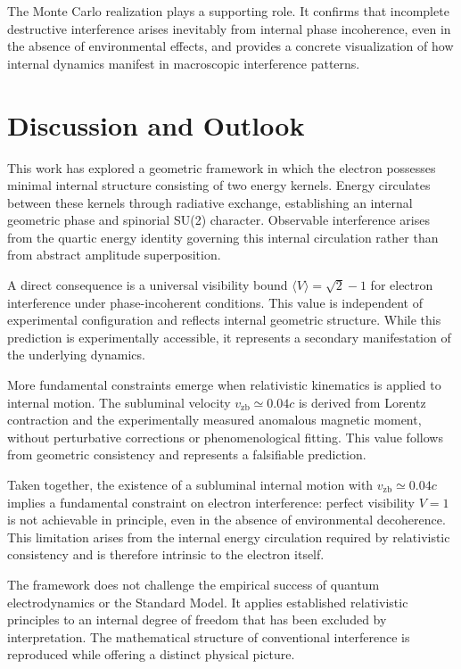\documentclass[%
 reprint,
 amsmath,amssymb,
 aps,
 prb,
]{revtex4-2}
\numberwithin{equation}{section}
\begin{document}
The Monte Carlo realization plays a supporting role. It confirms that incomplete destructive interference arises inevitably from internal phase incoherence, even in the absence of environmental effects, and provides a concrete visualization of how internal dynamics manifest in macroscopic interference patterns.


\section{Discussion and Outlook}
\label{sec:discussion}

This work has explored a geometric framework in which the electron possesses minimal internal structure consisting of two energy kernels. Energy circulates between these kernels through radiative exchange, establishing an internal geometric phase and spinorial SU(2) character. Observable interference arises from the quartic energy identity governing this internal circulation rather than from abstract amplitude superposition.

A direct consequence is a universal visibility bound $\langle V \rangle = \sqrt{2} - 1$ for electron interference under phase-incoherent conditions. This value is independent of experimental configuration and reflects internal geometric structure. While this prediction is experimentally accessible, it represents a secondary manifestation of the underlying dynamics.

More fundamental constraints emerge when relativistic kinematics is applied to internal motion. The subluminal velocity $v_{\mathrm{zb}} \simeq 0.04c$ is derived from Lorentz contraction and the experimentally measured anomalous magnetic moment, without perturbative corrections or phenomenological fitting. This value follows from geometric consistency and represents a falsifiable prediction.

Taken together, the existence of a subluminal internal motion with $v_{\mathrm{zb}} \simeq 0.04c$ implies a fundamental constraint on electron interference: perfect visibility $V=1$ is not achievable in principle, even in the absence of environmental decoherence. This limitation arises from the internal energy circulation required by relativistic consistency and is therefore intrinsic to the electron itself.

The framework does not challenge the empirical success of quantum electrodynamics or the Standard Model. It applies established relativistic principles to an internal degree of freedom that has been excluded by interpretation. The mathematical structure of conventional interference is reproduced while offering a distinct physical picture.
\end{document}
